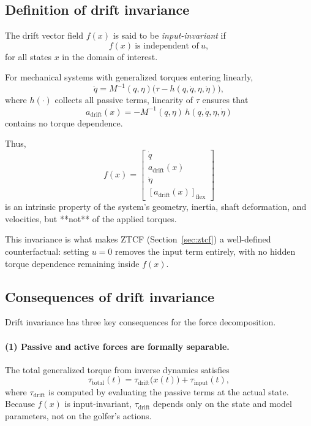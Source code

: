 \documentclass[12pt]{article}
\newcommand{\qd}{\dot{q}}
\newcommand{\qdd}{\ddot{q}}
\newcommand{\etad}{\dot{\eta}}
\begin{document}
\subsection{Definition of drift invariance}

The drift vector field \(f(x)\) is said to be \emph{input-invariant} if
\begin{equation}
  f(x) \ \text{is independent of} \ u,
  \label{eq:drift_invariance_def}
\end{equation}
for all states \(x\) in the domain of interest.  

For mechanical systems with generalized torques entering linearly,
\[
  \qdd = M^{-1}(q,\eta)\big(\tau - h(q,\qd,\eta,\etad)\big),
\]
where \(h(\cdot)\) collects all passive terms, linearity of \(\tau\) ensures that
\begin{equation}
  a_{\text{drift}}(x)
  =
  -M^{-1}(q,\eta)\,h(q,\qd,\eta,\etad)
  \label{eq:drift_terms}
\end{equation}
contains no torque dependence.  

Thus,
\begin{equation}
  f(x) =
  \begin{bmatrix}
    \qd \\ a_{\text{drift}}(x) \\ \etad \\ [a_{\text{drift}}(x)]_{\text{flex}}
  \end{bmatrix}
\end{equation}
is an intrinsic property of the system’s geometry, inertia, shaft deformation, and velocities, but **not** of the applied torques.

This invariance is what makes ZTCF (Section~\ref{sec:ztcf}) a well-defined counterfactual: setting \(u=0\) removes the input term entirely, with no hidden torque dependence remaining inside \(f(x)\).

\subsection{Consequences of drift invariance}

Drift invariance has three key consequences for the force decomposition.

\paragraph{(1) Passive and active forces are formally separable.}
The total generalized torque from inverse dynamics satisfies
\[
  \tau_{\text{total}}(t)
  = 
  \tau_{\text{drift}}\big(x(t)\big)
  +
  \tau_{\text{input}}(t),
\]
where \(\tau_{\text{drift}}\) is computed by evaluating the passive terms at the actual state.  
Because \(f(x)\) is input-invariant, \(\tau_{\text{drift}}\) depends only on the state and model parameters, not on the golfer’s actions.
\end{document}

